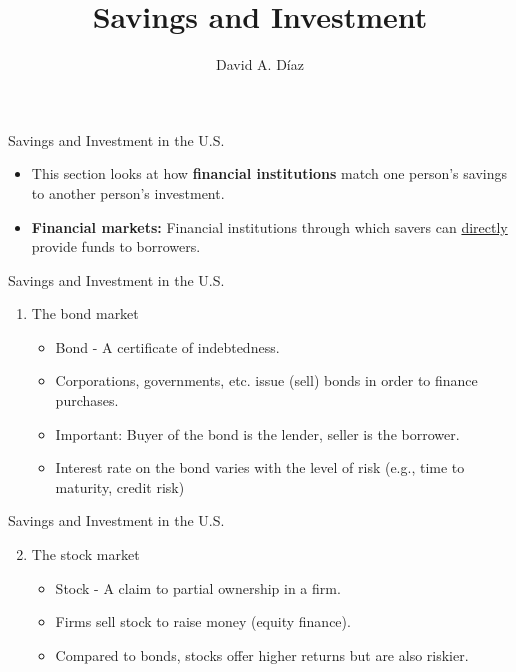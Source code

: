 \documentclass[xcolor={dvipsnames},pdf, hyperref={colorlinks=true, citecolor=ForestGreen, linkcolor=BlueViolet, urlcolor=Magenta}]{beamer}
\title{Savings and Investment}
\author{David A. D\'iaz}
\institute{UNC Chapel Hill}
\date{}
\theoremstyle{definition}
\newcommand{\defn}[1]{\textbf{#1}}
\begin{document}
 
	
	\begin{frame}
		
		\titlepage
		
	\end{frame}


\begin{frame}{Savings and Investment in the U.S.}
\begin{itemize}
	\item This section looks at how \textbf{financial institutions} match one person's savings to another person's investment. 
	\item \defn{Financial markets:} Financial institutions through which savers can \underline{directly} provide funds to borrowers.

\end{itemize}
\end{frame}

\begin{frame}{Savings and Investment in the U.S.}

	\begin{enumerate}
		\item The bond market
		\begin{itemize}
			\item Bond - A certificate of indebtedness.
			\item Corporations, governments, etc. issue (sell) bonds in order to finance purchases. 
			\item Important: Buyer of the bond is the lender, seller is the borrower.
			\item Interest rate on the bond varies with the level of risk (e.g., time to maturity, credit risk)
		\end{itemize}  

		
	\end{enumerate}

\end{frame}


\begin{frame}{Savings and Investment in the U.S.}

\begin{enumerate}
\setcounter{enumi}{1}
	\item The stock market
	\begin{itemize}
		\item Stock - A claim to partial ownership in a firm.
		\item  Firms sell stock to raise money (equity finance).
		\item Compared to bonds, stocks offer higher returns but are also riskier.
	\end{itemize}  
	
\end{enumerate}

\end{frame}
\end{document}
